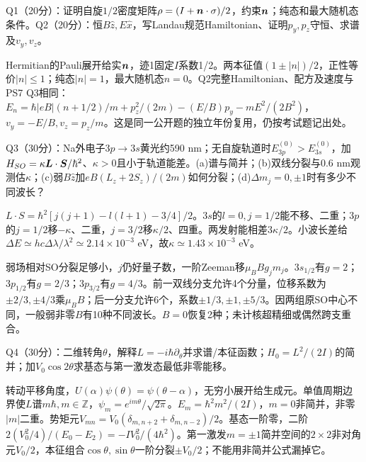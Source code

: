 \begin{exercise}
Q1（20分）：证明自旋$1/2$密度矩阵$\rho=(I+\boldsymbol{n}\cdot\sigma)/2$，约束$\boldsymbol{n}$；纯态和最大随机态条件。Q2（20分）：恒$B\hat z,E\hat x$，写Landau规范Hamiltonian、证明$p_y,p_z$守恒、求谱及$v_y,v_z$。
\end{exercise}
\begin{solution}
Hermitian的Pauli展开给实$\boldsymbol{n}$，迹1固定$I$系数1/2。两本征值$(1\pm|n|)/2$，正性等价$|n|\le1$；纯态$|n|=1$，最大随机态$n=0$。Q2完整Hamiltonian、配方及速度与PS7 Q3相同：$E_{n}=\hbar|eB|(n+1/2)/m+p_z^2/(2m)-(E/B)p_y-mE^2/(2B^2)$，$v_y=-E/B,v_z=p_z/m$。这是同一公开题的独立年份复用，仍按考试题记出处。
\end{solution}

\begin{exercise}
Q3（30分）：Na外电子$3p\to3s$黄光约590 nm；无自旋轨道时$E_{3p}^{(0)}>E_{3s}^{(0)}$，加$H_{SO}=\kappa\boldsymbol{L}\cdot\boldsymbol{S}/\hbar^2$、$\kappa>0$且小于轨道能差。(a)谱与简并；(b)双线分裂与0.6 nm观测估$\kappa$；(c)弱$B\hat z$加$eB(L_z+2S_z)/(2m)$如何分裂；(d)$\Delta m_j=0,\pm1$时有多少不同波长？
\end{exercise}
\begin{solution}
$L\cdot S=\hbar^2[j(j+1)-l(l+1)-3/4]/2$。$3s$的$l=0,j=1/2$能不移、二重；$3p$的$j=1/2$移$-\kappa$、二重，$j=3/2$移$\kappa/2$、四重。两发射能相差$3\kappa/2$。小波长差给$\Delta E\simeq hc\Delta\lambda/\lambda^2\simeq2.14\times10^{-3}$ eV，故$\kappa\simeq1.43\times10^{-3}$ eV。

弱场相对SO分裂足够小，$j$仍好量子数，一阶Zeeman移$\mu_BBg_jm_j$。$3s_{1/2}$有$g=2$；$3p_{1/2}$有$g=2/3$；$3p_{3/2}$有$g=4/3$。前一双线分支允许4个分量，位移系数为$\pm2/3,\pm4/3$乘$\mu_BB$；后一分支允许6个，系数$\pm1/3,\pm1,\pm5/3$。因两组原SO中心不同，一般弱非零$B$有10种不同波长。$B=0$恢复2种；未计核超精细或偶然跨支重合。
\end{solution}
\begin{exercise}
Q4（30分）：二维转角$\theta$，解释$L=-i\hbar\partial_\theta$并求谱/本征函数；$H_0=L^2/(2I)$的简并；加$V_0\cos2\theta$求基态与第一激发态最低非零能移。
\end{exercise}
\begin{solution}
转动平移角度，$U(\alpha)\psi(\theta)=\psi(\theta-\alpha)$，无穷小展开给生成元。单值周期边界使$L$谱$m\hbar,m\in\mathbb Z$，$\psi_m=e^{im\theta}/\sqrt{2\pi}$。$E_m=\hbar^2m^2/(2I)$，$m=0$非简并，非零$|m|$二重。势矩元$V_{mn}=V_0(\delta_{m,n+2}+\delta_{m,n-2})/2$。基态一阶零，二阶$2(V_0^2/4)/(E_0-E_2)=-IV_0^2/(4\hbar^2)$。第一激发$m=\pm1$简并空间的$2\times2$非对角元$V_0/2$，本征组合$\cos\theta,\sin\theta$一阶分裂$\pm V_0/2$；不能用非简并公式漏掉它。
\end{solution}

